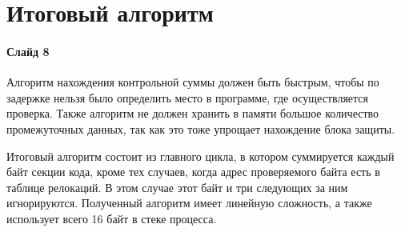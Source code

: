 
\section{Итоговый алгоритм}

\paragraph{Слайд 8}\mbox{}\par

Алгоритм нахождения контрольной суммы должен быть быстрым, чтобы по задержке
нельзя было определить место в программе, где осуществляется проверка. Также
алгоритм не должен хранить в памяти большое количество промежуточных данных, так
как это тоже упрощает нахождение блока защиты.

Итоговый алгоритм состоит из главного цикла, в котором суммируется каждый байт
секции кода, кроме тех случаев, когда адрес проверяемого байта есть в таблице
релокаций. В этом случае этот байт и три следующих за ним игнорируются. 
Полученный алгоритм имеет линейную сложность, а также использует всего 16 байт
в стеке процесса.
